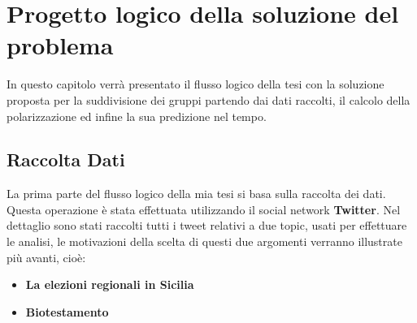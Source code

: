 \chapter{Progetto logico della soluzione del problema}
\label{capitolo4}
\thispagestyle{empty}

\noindent %

In questo capitolo verrà presentato il flusso logico della tesi con la soluzione proposta per la suddivisione dei gruppi partendo dai dati raccolti, il calcolo della polarizzazione ed infine la sua predizione nel tempo.

\section{Raccolta Dati}
La prima parte del flusso logico della mia tesi si basa sulla raccolta dei dati. Questa operazione è stata effettuata utilizzando il social network \textbf{Twitter}. Nel dettaglio sono stati raccolti tutti i tweet relativi a due topic, usati per effettuare le analisi, le motivazioni della scelta di questi due argomenti verranno illustrate più avanti, cioè:
\begin{itemize}
\item \textbf{La elezioni regionali in Sicilia}
\item \textbf{Biotestamento}
\end{itemize}


